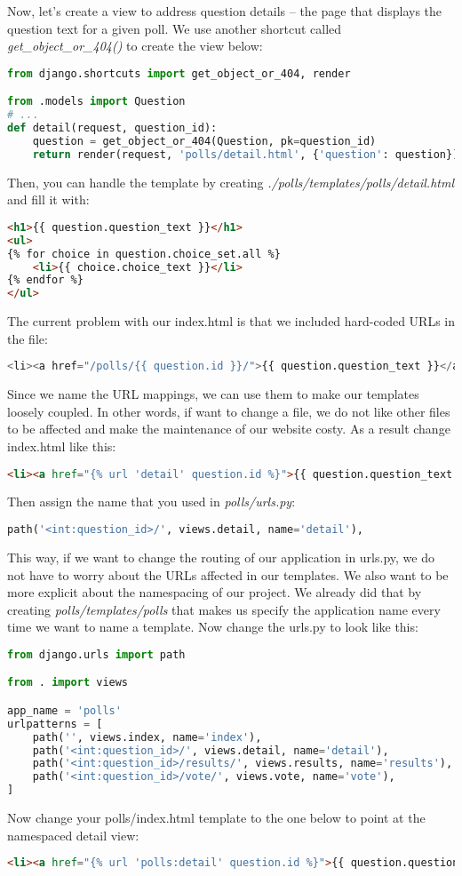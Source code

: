 \documentclass{homework}
\begin{document}
Now, let’s create a view to address question details – the page that displays the question text for a given poll. We use another shortcut called \textit{get\_object\_or\_404()} to create the view below:
\begin{lstlisting}[language=Python]
from django.shortcuts import get_object_or_404, render

from .models import Question
# ...
def detail(request, question_id):
    question = get_object_or_404(Question, pk=question_id)
    return render(request, 'polls/detail.html', {'question': question})
\end{lstlisting}

Then, you can handle the template by creating \textit{./polls/templates/polls/detail.html}
and fill it with:
\begin{lstlisting}[language=HTML]
<h1>{{ question.question_text }}</h1>
<ul>
{% for choice in question.choice_set.all %}
    <li>{{ choice.choice_text }}</li>
{% endfor %}
</ul>
\end{lstlisting}
The current problem with our index.html is that we included hard-coded URLs in the file:
\begin{lstlisting}[language=Python]
<li><a href="/polls/{{ question.id }}/">{{ question.question_text }}</a></li>
\end{lstlisting}
Since we name the URL mappings, we can use them to make our templates loosely coupled. In other words, if want to change a file, we do not like other files to be affected and make the maintenance of our website costy. As a result change index.html like this:
\begin{lstlisting}[language=HTML]
<li><a href="{% url 'detail' question.id %}">{{ question.question_text }}</a></li>
\end{lstlisting}
Then assign the name that you used in \textit{polls/urls.py}:
\begin{lstlisting}[language=Python]
path('<int:question_id>/', views.detail, name='detail'),
\end{lstlisting}
This way, if we want to change the routing of our application in urls.py, we do not have to worry about the URLs affected in our templates.
We also want to be more explicit about the namespacing of our project. We already did that by creating \textit{polls/templates/polls} that makes us specify the application name every time we want to name a template. Now change the urls.py to look like this:
\begin{lstlisting}[language=Python]
from django.urls import path

from . import views

app_name = 'polls'
urlpatterns = [
    path('', views.index, name='index'),
    path('<int:question_id>/', views.detail, name='detail'),
    path('<int:question_id>/results/', views.results, name='results'),
    path('<int:question_id>/vote/', views.vote, name='vote'),
]
\end{lstlisting}
Now change your polls/index.html template to the one below to point at the namespaced detail view:
\begin{lstlisting}[language=HTML]
<li><a href="{% url 'polls:detail' question.id %}">{{ question.question_text }}</a></li>
\end{lstlisting}
 
\end{document}
